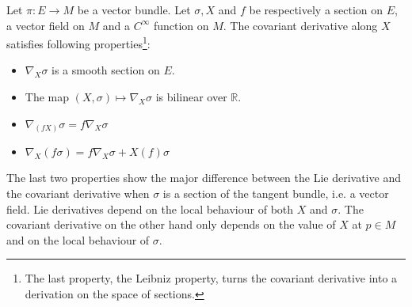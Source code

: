 	
	\begin{property}
		Let $\pi:E\rightarrow M$ be a vector bundle. Let $\sigma, X$ and $f$ be respectively a section on $E$, a vector field on $M$ and a $C^\infty$ function on $M$. The covariant derivative along $X$ satisfies following properties\footnote{The last property, the Leibniz property, turns the covariant derivative into a derivation on the space of sections.}:
		\begin{itemize}
			\item $\nabla_X\sigma$ is a smooth section on $E$.
			\item The map $(X, \sigma)\mapsto\nabla_X\sigma$ is bilinear over $\mathbb{R}$.
			\item $\nabla_{(fX)}\sigma = f\nabla_X\sigma$
			\item $\nabla_X(f\sigma) = f\nabla_X\sigma + X(f)\sigma$
		\end{itemize}
	\end{property}
	\begin{remark}
		The last two properties show the major difference between the Lie derivative and the covariant derivative when $\sigma$ is a section of the tangent bundle, i.e. a vector field. Lie derivatives depend on the local behaviour of both $X$ and $\sigma$. The covariant derivative on the other hand only depends on the value of $X$ at $p\in M$ and on the local behaviour of $\sigma$.
	\end{remark}
	
	
